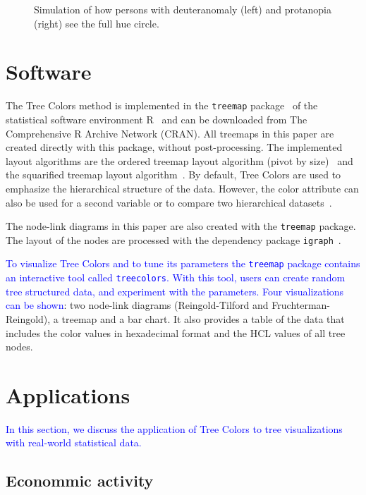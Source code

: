 \documentclass[journal]{vgtc}                %
\newcommand{\changedM}[1]{\textcolor{blue}{#1}}
\begin{document}
\begin{figure}[tb]
  \centering
  \caption{Simulation of how persons with deuteranomaly (left) and protanopia (right) see the full hue circle.}\label{fig:colblind}
\end{figure}


\section{Software}

The Tree Colors method is implemented in the \texttt{treemap} package~\cite{treemap} of the statistical software environment R~\cite{r2013} and can be downloaded from The Comprehensive R Archive Network (CRAN). All treemaps in this paper are created directly with this package, without post-processing. The implemented layout algorithms are the ordered treemap layout algorithm (pivot by size)~\cite{Bederson2002} and the squarified treemap layout algorithm~\cite{bruls99}. By default, Tree Colors are used to emphasize the hierarchical structure of the data. However, the color attribute can also be used for a second variable or to compare two hierarchical datasets~\cite{tennekes2011b}. 

The node-link diagrams in this paper are also created with the \texttt{treemap} package. The layout of the nodes are processed with the dependency package \texttt{igraph}~\cite{igraph}.

\changedM{To visualize Tree Colors and to tune its parameters the \texttt{treemap} package contains an interactive tool called \texttt{treecolors}. With this tool, users can create random tree structured data, and experiment with the parameters. Four visualizations can be shown}: two node-link diagrams (Reingold-Tilford and Fruchterman-Reingold), a treemap and a bar chart. It also provides a table of the data that includes the color values in hexadecimal format and the HCL values of all tree nodes.




\section{Applications}\label{secapplication}

\changedM{In this section, we discuss the application of Tree Colors to tree visualizations with real-world statistical data.}

\subsection{Econommic activity}
\end{document}
